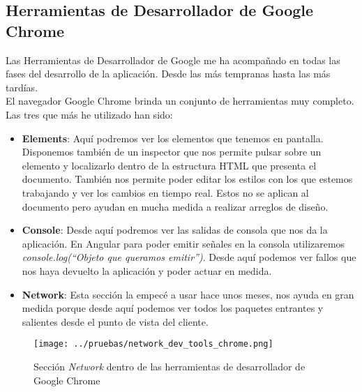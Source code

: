 \subsection{Herramientas de Desarrollador de Google Chrome}
Las Herramientas de Desarrollador de Google me ha acompañado en todas las fases del desarrollo de la aplicación. Desde las más tempranas hasta las más tardías.
\\El navegador Google Chrome brinda un conjunto de herramientas muy completo. Las tres que más he utilizado han sido:
\begin{itemize}
    \item \textbf{Elements}: Aquí podremos ver los elementos que tenemos en pantalla. Disponemos también de un inspector que nos permite pulsar sobre un elemento y localizarlo dentro de la estructura HTML que presenta el documento. También nos permite poder editar los estilos con los que estemos trabajando y ver los cambios en tiempo real. Estos no se aplican al documento pero ayudan en mucha medida a realizar arreglos de diseño.
    \item \textbf{Console}: Desde aquí podremos ver las salidas de consola que nos da la aplicación. En Angular para poder emitir señales en la consola utilizaremos \textit{console.log(``Objeto que queramos emitir'')}. Desde aquí podemos ver fallos que nos haya devuelto la aplicación y poder actuar en medida.
    \item \textbf{Network}: Esta sección la empecé a usar hace unos meses, nos ayuda en gran medida porque desde aquí podemos ver todos los paquetes entrantes y salientes desde el punto de vista del cliente.
\end{itemize}
\begin{figure}[h]
    \centering
    \texttt{[image: ../pruebas/network\_dev\_tools\_chrome.png]}
    \caption{Sección \textit{Network} dentro de las herramientas de desarrollador de Google Chrome}
\end{figure}
